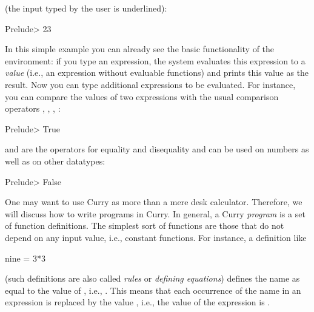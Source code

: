 (the input typed by the user is underlined):
\begin{prog}
Prelude> 
23
\end{prog}
In this simple example you can already see the basic functionality
of the environment: if you type an expression, the system
evaluates this expression to a \emph{value}
(i.e., an expression without evaluable functions)
and prints this value as the result. %
Now you can type additional expressions to be evaluated. For instance,
you can compare the values of two expressions with the
usual comparison operators \code{>}, \code{<}, \code{<=}, \code{>=}:
\begin{prog}
Prelude> 
True
\end{prog}
\code{==} and \code{/=} are the operators for equality and disequality
and can be used on numbers as well as on other datatypes:
\begin{prog}
Prelude> 
False
\end{prog}
% 
One may want to use Curry as more than a mere desk calculator. Therefore, we will discuss how to write programs in Curry.
In general, a Curry \emph{program}
is a set of function definitions.
The simplest sort of functions are those that do not depend
on any input value, i.e., constant functions.
For instance, a definition like
\begin{curry}
nine = 3*3
\end{curry}
(such definitions are also called \emph{rules}
or \emph{defining equations})
defines the name  as equal to the value of ,
i.e., . This means that each occurrence of the name 
in an expression is replaced by the value , i.e., the value
of the expression  is .

